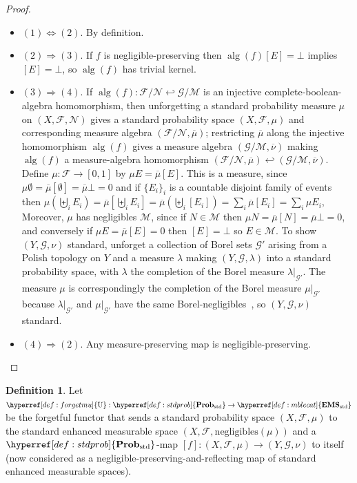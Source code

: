 \documentclass[
  sigconf,
  screen, ]{acmart}
\theoremstyle{definition}
\newtheorem{definition}[theorem]{Definition}
\newcommand\calF{\mathcal F}
\newcommand\calG{\mathcal G}
\newcommand\calM{\mathcal M}
\newcommand\calN{\mathcal N}
\newcommand\fremlinf[3]{\cite[\href{https://www1.essex.ac.uk/maths/people/fremlin/chap#2.pdf\#page=#3}{#1}]{fremlin2000measure}}
\newcommand\nref[2]{\hyperref[#1]{#2}} \newcommand\checkhigh{{\huge{\color{red}\textbf{TODO: check}}}}
\newcommand\measalg{\operatorname{\nref{app:cons:measalg}{alg}}}
\newcommand\negligibles{\mathrm{negligibles}}
\newcommand\texforgetmu{\mathrm{U}}
\newcommand\forgetmu{{\nref{def:forgetmu}{\texforgetmu}}}
\newcommand\texStdProb{\mathbf{Prob}_{\rm std}}
\newcommand\StdProb{{\nref{def:stdprob}{\texStdProb}}}
\newcommand\texStdMble{\mathbf{EMS}_{\rm std}}
\newcommand\StdMble{{\nref{def:mblecat}{\texStdMble}}}
\begin{document}
\begin{proof}~
  \begin{itemize}
  \item $(1)\Leftrightarrow(2)$. By definition.
  \item $(2)\Rightarrow(3)$.
    If $f$ is negligible-preserving
    then $\measalg(f)[E] = \bot$ implies $[E] = \bot$,
    so $\measalg(f)$ has trivial kernel.
  \item $(3)\Rightarrow(4)$.
    If $\measalg(f) : \calF/\calN\hookleftarrow\calG/\calM$ 
    is an injective complete-boolean-algebra homomorphism,
    then unforgetting a standard probability measure $\mu$
    on $(X,\calF,\calN)$ gives a standard probability space
    $(X,\calF,\mu)$ and corresponding measure algebra
    $(\calF/\calN, \overline\mu)$;
    restricting $\overline\mu$ along the injective homomorphism $\measalg(f)$
    gives a measure algebra $(\calG/\calM,\overline\nu)$
    making $\measalg(f)$
    a measure-algebra homomorphism $(\calF/\calN,\overline\mu)
    \hookleftarrow(\calG/\calM,\overline\nu)$.
    Define $\mu : \calF\to[0,1]$ by $\mu E = \overline\mu[E]$.
    This is a measure,
    since $\mu\emptyset = \overline\mu[\emptyset] = \overline\mu \bot = 0$
    and if $\{E_i\}_i$ is a countable disjoint family of events
      then $\mu(\biguplus_i E_i) =
      \overline\mu[\biguplus_i E_i]
      = \overline\mu(\biguplus_i [E_i])
      = \sum_i \overline\mu [E_i]
      = \sum_i \mu E_i
      $,
    Moreover, $\mu$ has negligibles $\calM$,
    since if $N\in\calM$ then $\mu N = \overline\mu [N]
      = \overline\mu\bot = 0$, and conversely if $\mu E = \overline\mu[E] = 0$
       then $[E] = \bot$ so $E\in\calM$.
    To show $(Y,\calG,\nu)$ standard,
    unforget a collection of Borel sets $\calG'$
    arising from a Polish topology on $Y$
    and a measure $\lambda$ making $(Y,\calG,\lambda)$
    into a standard probability space, with $\lambda$
    the completion of the Borel measure $\lambda|_{\calG'}$.
    The measure $\mu$ is correspondingly the completion of the Borel measure
    $\mu|_{\calG'}$ because $\lambda|_{\calG'}$ and $\mu|_{\calG'}$
    have the same Borel-negligibles~\fremlinf{212E(d)}{21}{11},
    so $(Y,\calG,\nu)$ standard.
  \item $(4)\Rightarrow(2)$.
    Any measure-preserving map is negligible-preserving.
  \end{itemize}
\end{proof}

\begin{definition} \label{app:def:forgetmu}
  Let $\forgetmu : \StdProb\to \StdMble$ be the forgetful functor
  that sends a standard probability space $(X,\calF,\mu)$
  to the standard enhanced measurable space $(X,\calF,\negligibles(\mu))$
  and a $\StdProb$-map $[f] : (X,\calF,\mu)\to(Y,\calG,\nu)$
  to itself (now considered as a negligible-preserving-and-reflecting map of standard enhanced measurable spaces).
\end{definition}
\end{document}
